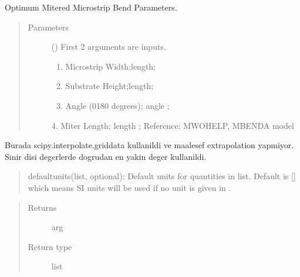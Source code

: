 \documentclass[letterpaper,10pt,english]{sphinxmanual}
\begin{document}

\begin{fulllineitems}
\label{\detokenize{components:components.OptimumMiteredArbitraryAngleMicrostripBend}}
Optimum Mitered Microstrip Bend Parameters.
\begin{quote}\begin{description}
\item[{Parameters}] \leavevmode
{} () \textendash{} 
First 2 arguments are inputs.
\begin{enumerate}
%
\item {} 
Microstrip Width;length;

\item {} 
Substrate Height;length;

\item {} 
Angle (0\sphinxhyphen{}180 degrees); angle ;

\end{enumerate}

4.  Miter Length; length ;
Reference: MWOHELP, MBENDA model


\end{description}\end{quote}

Burada scipy.interpolate.griddata kullanildi ve maalesef extrapolation yapmiyor. Sinir disi degerlerde dogrudan en yakin deger kullanildi.
\begin{quote}

defaultunits(list, optional): Default units for quantities in  list. Default is {[}{]} which means SI units will be used if no unit is given in .
\end{quote}
\begin{quote}\begin{description}
\item[{Returns}] \leavevmode
arg

\item[{Return type}] \leavevmode
list

\end{description}\end{quote}

\end{fulllineitems}
\end{document}
